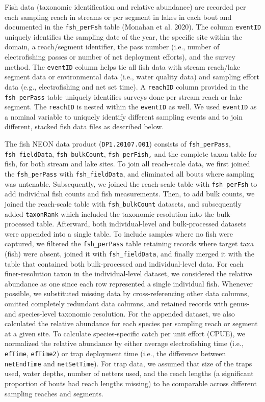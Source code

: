 \documentclass[
  12pt,
]{article}
\begin{document}
Fish data (taxonomic identification and relative abundance) are recorded per each sampling reach in streams or per segment in lakes in each bout and documented in the \texttt{fsh\_perFsh} table (Monahan et al. 2020). The column \texttt{eventID} uniquely identifies the sampling date of the year, the specific site within the domain, a reach/segment identifier, the pass number (i.e., number of electrofishing passes or number of net deployment efforts), and the survey method. The \texttt{eventID} column helps tie all fish data with stream reach/lake segment data or environmental data (i.e., water quality data) and sampling effort data (e.g., electrofishing and net set time). A \texttt{reachID} column provided in the \texttt{fsh\_perPass} table uniquely identifies surveys done per stream reach or lake segment. The \texttt{reachID} is nested within the \texttt{eventID} as well. We used \texttt{eventID} as a nominal variable to uniquely identify different sampling events and to join different, stacked fish data files as described below.

The fish NEON data product (\texttt{DP1.20107.001}) consists of \texttt{fsh\_perPass}, \texttt{fsh\_fieldData}, \texttt{fsh\_bulkCount}, \texttt{fsh\_perFish,} and the complete taxon table for fish, for both stream and lake sites. To join all reach-scale data, we first joined the \texttt{fsh\_perPass} with \texttt{fsh\_fieldData}, and eliminated all bouts where sampling was untenable. Subsequently, we joined the reach-scale table with \texttt{fsh\_perFsh} to add individual fish counts and fish measurements. Then, to add bulk counts, we joined the reach-scale table with \texttt{fsh\_bulkCount} datasets, and subsequently added \texttt{taxonRank} which included the taxonomic resolution into the bulk-processed table. Afterward, both individual-level and bulk-processed datasets were appended into a single table. To include samples where no fish were captured, we filtered the \texttt{fsh\_perPass} table retaining records where target taxa (fish) were absent, joined it with \texttt{fsh\_fieldData}, and finally merged it with the table that contained both bulk-processed and individual-level data. For each finer-resolution taxon in the individual-level dataset, we considered the relative abundance as one since each row represented a single individual fish. Whenever possible, we substituted missing data by cross-referencing other data columns, omitted completely redundant data columns, and retained records with genus- and species-level taxonomic resolution. For the appended dataset, we also calculated the relative abundance for each species per sampling reach or segment at a given site. To calculate species-specific catch per unit effort (CPUE), we normalized the relative abundance by either average electrofishing time (i.e., \texttt{efTime}, \texttt{efTime2}) or trap deployment time (i.e., the difference between \texttt{netEndTime} and \texttt{netSetTime}). For trap data, we assumed that size of the traps used, water depths, number of netters used, and the reach lengths (a significant proportion of bouts had reach lengths missing) to be comparable across different sampling reaches and segments.
\end{document}
